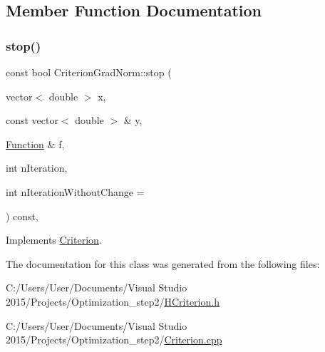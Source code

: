 \subsection{Member Function Documentation}
\mbox{\label{class_criterion_grad_norm_aa482b08006d20c4aac09c0322feb3d6e}} 
\subsubsection{\texorpdfstring{stop()}{stop()}}
{\footnotesize\ttfamily const bool Criterion\+Grad\+Norm\+::stop (\begin{DoxyParamCaption}\item[{vector$<$ double $>$}]{x,  }\item[{const vector$<$ double $>$ \&}]{y,  }\item[{\hyperlink{class_function}{Function} \&}]{f,  }\item[{int}]{n\+Iteration,  }\item[{int}]{n\+Iteration\+Without\+Change = {} }\end{DoxyParamCaption}) const\hspace{0.3cm}{\ttfamily [override]}, {\ttfamily [virtual]}}



Implements \hyperlink{class_criterion_aee3e2148c665c72c50c2f870a3ca8cdc}{Criterion}.



The documentation for this class was generated from the following files\+:\begin{DoxyCompactItemize}
\item 
C\+:/\+Users/\+User/\+Documents/\+Visual Studio 2015/\+Projects/\+Optimization\+\_\+step2/\hyperlink{_h_criterion_8h}{H\+Criterion.\+h}\item 
C\+:/\+Users/\+User/\+Documents/\+Visual Studio 2015/\+Projects/\+Optimization\+\_\+step2/\hyperlink{_criterion_8cpp}{Criterion.\+cpp}\end{DoxyCompactItemize}
